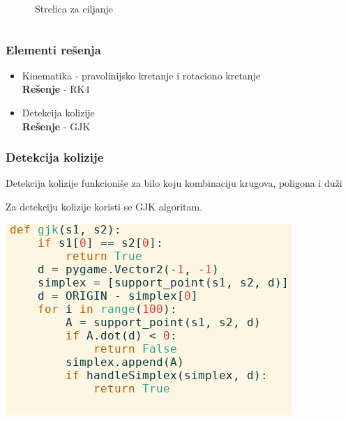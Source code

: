 \documentclass{beamer}
\begin{document}
\begin{frame}
\begin{columns}
\begin{itemize}
		\end{itemize}
		\begin{center}
		\end{center}
		\begin{center}
		Strelica za ciljanje
		\end{center}
		\vspace{2cm}
	\end{columns}
\end{frame}

\begin{frame}
	\frametitle{Elementi rešenja}
	\Large
	\begin{itemize}
		\item Kinematika - pravolinijsko kretanje i rotaciono kretanje\\
		\textbf{Rešenje} - RK4
		\item Detekcija kolizije\\
		\textbf{Rešenje} - GJK
	\end{itemize}
\end{frame}

\begin{frame}
	\frametitle{Detekcija kolizije}
	Detekcija kolizije funkcioniše za bilo koju kombinaciju krugova, poligona i duži
	
	Za detekciju kolizije koristi se GJK algoritam.
	\begin{center}
		\includegraphics[scale=0.5]{./images/gjk.png}
	\end{center}
\end{frame}
\end{document}
